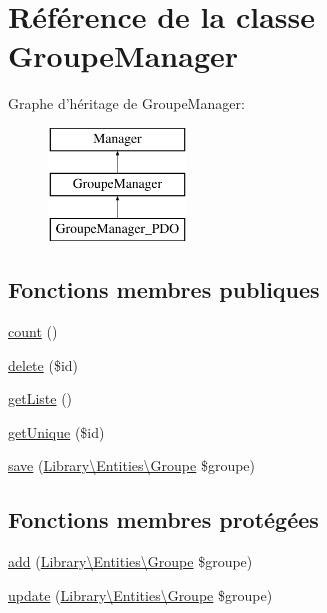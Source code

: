 \hypertarget{class_library_1_1_models_1_1_groupe_manager}{\section{Référence de la classe Groupe\+Manager}
\label{class_library_1_1_models_1_1_groupe_manager}
}
Graphe d'héritage de Groupe\+Manager\+:\begin{figure}[H]
\begin{center}
\leavevmode
\includegraphics[height=3.000000cm]{class_library_1_1_models_1_1_groupe_manager}
\end{center}
\end{figure}
\subsection*{Fonctions membres publiques}
\begin{DoxyCompactItemize}
\item 
\hyperlink{class_library_1_1_models_1_1_groupe_manager_ac751e87b3d4c4bf2feb03bee8b092755}{count} ()
\item 
\hyperlink{class_library_1_1_models_1_1_groupe_manager_a2f8258add505482d7f00ea26493a5723}{delete} (\$id)
\item 
\hyperlink{class_library_1_1_models_1_1_groupe_manager_a20b3a2f576f3ea746f769779a329491e}{get\+Liste} ()
\item 
\hyperlink{class_library_1_1_models_1_1_groupe_manager_ab94c8b937a2aa55fce0bb7f77f68c00e}{get\+Unique} (\$id)
\item 
\hyperlink{class_library_1_1_models_1_1_groupe_manager_ad14bbac65edd6c0f46f7ce1c8e1c197d}{save} (\hyperlink{class_library_1_1_entities_1_1_groupe}{Library\textbackslash{}\+Entities\textbackslash{}\+Groupe} \$groupe)
\end{DoxyCompactItemize}
\subsection*{Fonctions membres protégées}
\begin{DoxyCompactItemize}
\item 
\hyperlink{class_library_1_1_models_1_1_groupe_manager_a6d9990d08d849705ce64cc1e11153459}{add} (\hyperlink{class_library_1_1_entities_1_1_groupe}{Library\textbackslash{}\+Entities\textbackslash{}\+Groupe} \$groupe)
\item 
\hyperlink{class_library_1_1_models_1_1_groupe_manager_aa1522ff5f9e533f795b3be14c17c67c0}{update} (\hyperlink{class_library_1_1_entities_1_1_groupe}{Library\textbackslash{}\+Entities\textbackslash{}\+Groupe} \$groupe)
\end{DoxyCompactItemize}
